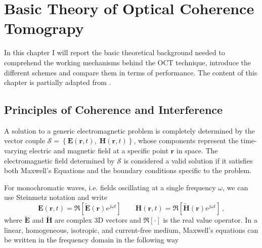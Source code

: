 
\chapter{Basic Theory of Optical Coherence Tomograpy} %
\label{ch:theory} %

In this chapter I will report the basic theoretical background needed to comprehend the working mechanisms behind the OCT technique, introduce the different schemes and compare them in terms of performance. The content of this chapter is partially adapted from \cite{Midrio2006,Someda2006,Wolf1999}. 


\section{Principles of Coherence and Interference}
A solution to a generic electromagnetic problem is completely determined by the vector couple $\mathcal{S} = \left\{\mathbf{E}(\mathbf{r}, t),\; \mathbf{H}(\mathbf{r}, t)\right\}$, whose components represent the time-varying electric and magnetic field at a specific point $\textbf{r}$  in space. The electromagnetic field determined by $\mathcal{S}$ is considered a valid solution if it satisfies both Maxwell's Equations and the boundary conditions specific to the problem. 

For monochromatic waves, i.e. fields oscillating at a single frequency $\omega$, we can use Steinmetz notation and write
\begin{equation}\label{eq:steinmetz}
	\textbf{E}(\textbf{r}, t) = \Re\left[\widetilde{\mathbf{E}}(\textbf{r})e^{j\omega t}\right] \qquad \textbf{H}(\textbf{r}, t) = \Re\left[\widetilde{\mathbf{H}}(\textbf{r})e^{j\omega t}\right]\,,
\end{equation}
where $\widetilde{\textbf{E}}$ and $\widetilde{\textbf{H}}$ are complex 3D vectors and $\Re\left[\cdot\right]$ is the real value operator. In a linear, homogeneous, isotropic, and current-free medium, Maxwell's equations can be written in the frequency domain in the following way

